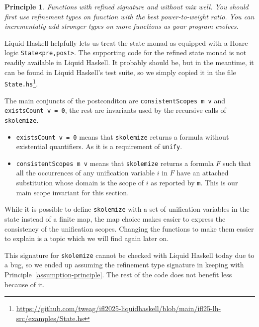 \documentclass[sigconf, review]{acmart}
\newcommand{\tc}[1]{{\small\texttt{#1}}}
\newcommand{\sourcefile}[1]{\tc{#1}\footnote{\scriptsize\url{https://github.com/tweag/ifl2025-liquidhaskell/blob/main/ifl25-lh-src/examples/#1}}}
\newtheorem{principle}{Principle}
\begin{document}
\begin{principle}
  Functions with refined signature and without mix well. You should first use
  refinement types on function with the best power-to-weight ratio. You can
  incrementally add stronger types on more functions as your program evolves.
\end{principle}

Liquid Haskell helpfully lets us treat the state monad as equipped with
a Hoare logic \tc{State<pre,post>}. The supporting code for the refined state
monad is not readily available in Liquid Haskell. It probably should be, but in
the meantime, it can be found in Liquid Haskell's test suite, so we simply
copied it in the file \sourcefile{State.hs}.

The main conjuncts of the postconditon are \tc{consistent\-Scopes m v} and
\tc{existsCount v = 0}, the rest are invariants used by the recursive calls of
\tc{skolemize}.
\begin{itemize}
  \item \tc{existsCount v = 0} means that \tc{skolemize} returns a formula without
  existential quantifiers. As it is a requirement of \tc{unify}.
  \item \tc{consistentScopes m v} means that \tc{skolemize} returns a
  formula $F$ such that all the occurrences of any unification variable $i$ in $F$
  have an attached substitution whose domain is the scope of $i$ as reported by \tc{m}. This is our main scope invariant for this
  section.
\end{itemize}

While it is possible to define \tc{skolemize} with a set of unification variables
in the state instead of a finite map, the map choice makes easier to express the
consistency of the unification scopes. Changing the functions to make them easier
to explain is a topic which we will find again later on.

This signature for \tc{skolemize} cannot be checked with Liquid Haskell today
due to
a bug, so we ended up assuming the refinement type signature
in keeping with Principle~\ref{assumption-principle}. The rest
of the code does not benefit less because of it.

\end{document}
